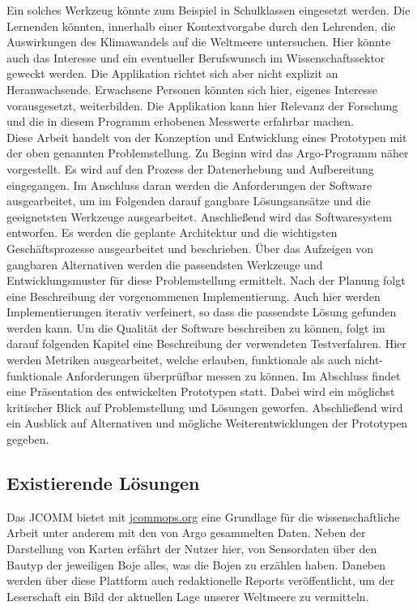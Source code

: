 Ein solches Werkzeug könnte zum Beispiel in Schulklassen eingesetzt werden.
Die Lernenden könnten, innerhalb einer Kontextvorgabe durch den Lehrenden, die Auswirkungen des Klimawandels auf die Weltmeere untersuchen.
Hier könnte auch das Interesse und ein eventueller Berufswunsch im Wissenschaftssektor geweckt werden.
Die Applikation richtet sich aber nicht explizit an Heranwachsende. Erwachsene Personen könnten sich hier, eigenes Interesse vorausgesetzt, weiterbilden. Die Applikation kann hier Relevanz der Forschung und die in diesem Programm erhobenen Messwerte erfahrbar machen. \\


Diese Arbeit handelt von der Konzeption und Entwicklung eines Prototypen mit der oben genannten Problemstellung. Zu Beginn wird das Argo-Programm näher vorgestellt. Es wird auf den Prozess der Datenerhebung und Aufbereitung eingegangen. Im Anschluss daran werden die Anforderungen der Software ausgearbeitet, um im Folgenden darauf gangbare Lösungsansätze und die geeignetsten Werkzeuge ausgearbeitet.
Anschließend wird das Softwaresystem entworfen. Es werden die geplante Architektur und die wichtigsten Geschäftsprozesse ausgearbeitet und beschrieben. Über das
Aufzeigen von gangbaren Alternativen werden die passendsten Werkzeuge und Entwicklungsmuster für diese Problemstellung ermittelt.
Nach der Planung folgt eine Beschreibung der vorgenommenen Implementierung. Auch hier werden Implementierungen iterativ verfeinert, so dass die passendste Lösung gefunden werden kann.
Um die Qualität der Software beschreiben zu können, folgt im darauf folgenden Kapitel eine Beschreibung der verwendeten Testverfahren. Hier werden Metriken ausgearbeitet, welche erlauben, funktionale als auch nicht-funktionale Anforderungen überprüfbar messen zu können.
Im Abschluss findet eine Präsentation des entwickelten Prototypen statt. Dabei wird ein möglichst kritischer Blick auf Problemstellung und Lösungen geworfen. Abschließend wird ein Ausblick auf Alternativen und mögliche Weiterentwicklungen der Prototypen gegeben.


\pagebreak
\subsection{Existierende Lösungen}


Das \gls{JCOMM} bietet mit
\url{jcommops.org} eine Grundlage für die wissenschaftliche Arbeit unter anderem mit den von Argo gesammelten Daten. Neben der Darstellung von Karten erfährt der Nutzer hier, von Sensordaten über den Bautyp der jeweiligen Boje alles, was die Bojen zu erzählen haben. Daneben werden über diese Plattform auch redaktionelle Reports veröffentlicht, um der Leserschaft ein Bild der aktuellen Lage unserer Weltmeere zu vermitteln.

